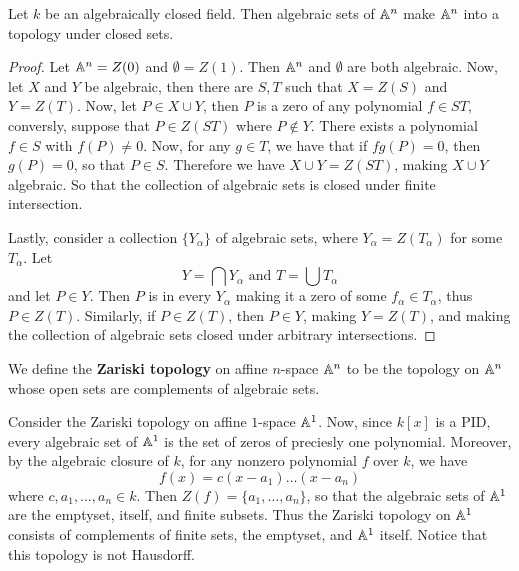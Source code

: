 \begin{lemma}\label{lemma_1.1.1}
    Let $k$ be an algebraically closed field. Then algebraic sets of $\mathbb{A}^n$ make
     $\mathbb{A}^n$ into a topology under closed sets.
\end{lemma}
\begin{proof}
    Let $\mathbb{A}^n=Z(0)$ and $\emptyset=Z(1)$. Then $\mathbb{A}^n$ and $\emptyset$ are both
    algebraic. Now, let  $X$ and  $Y$ be algebraic, then there are $S,T$ such
    that  $X=Z(S)$ and $Y=Z(T)$. Now, let $P \in X \cup Y$, then $P$ is a zero
    of any polynomial $f \in ST$, conversly, suppose that $P \in Z(ST)$ where $P
    \notin Y$. There exists a polynomial  $f \in S$ with $f(P) \neq 0$. Now, for
    any $g \in T$, we have that if $fg(P)=0$, then $g(P)=0$, so that $P \in S$.
    Therefore we have  $X \cup Y=Z(ST)$, making $X \cup Y$ algebraic. So that
    the collection of algebraic sets is closed under finite intersection.

    Lastly, consider a collection $\{Y_\alpha\}$ of algebraic sets, where
    $Y_\alpha=Z(T_\alpha)$ for some $T_\alpha$. Let
    \begin{equation*}
        Y=\bigcap{Y_\alpha} \text{ and } T=\bigcup{T_\alpha}
    \end{equation*}
    and let $P \in Y$. Then $P$ is in every $Y_\alpha$ making it a zero of some
    $f_\alpha \in T_\alpha$, thus  $P \in Z(T)$. Similarly, if $P \in Z(T)$, then
    $P \in Y$, making $Y=Z(T)$, and making the collection of algebraic sets
    closed under arbitrary intersections.
\end{proof}

\begin{definition}
    We define the \textbf{Zariski topology} on affine $n$-space  $\mathbb{A}^n$ to be
    the topology on $\mathbb{A}^n$ whose open sets are complements of algebraic sets.
\end{definition}

\begin{example}\label{example_1.2}
    Consider the Zariski topology on affine $1$-space  $\mathbb{A}^1$. Now, since $k[x]$
    is a PID,  every algebraic set of $\mathbb{A}^1$ is the set of zeros of preciesly
    one polynomial. Moreover, by the algebraic closure of  $k$, for any nonzero
    polynomial  $f$ over  $k$, we have
    \begin{equation*}
        f(x)=c(x-a_1) \dots (x-a_n)
    \end{equation*}
    where $c,a_1, \dots, a_n \in k$. Then $Z(f)=\{a_1, \dots, a_n\}$, so that
    the algebraic sets of $\mathbb{A}^1$ are the emptyset, itself, and finite subsets.
    Thus the Zariski topology on  $\mathbb{A}^1$ consists of complements of finite sets,
     the emptyset, and $\mathbb{A}^1$ itself. Notice that this topology is not
     Hausdorff.
\end{example}

